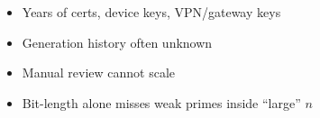 \documentclass[12pt,landscape]{article}
\newenvironment{slidepage}{%
  \noindent\begin{minipage}[t][\dimexpr\textheight-0.35cm\relax][s]{\textwidth}%
}{\end{minipage}\newpage}
\begin{document}
\begin{slidepage}
\begin{minipage}[t]{0.32\textwidth}
{\begin{minipage}[t]{0.94\textwidth}
\begin{itemize}\normalsize
  \item Years of certs, device keys, VPN/gateway keys
  \item Generation history often unknown
  \item Manual review cannot scale
  \item Bit-length alone misses weak primes inside ``large'' $n$
\end{itemize}
\vspace{3pt}\end{minipage}}
\end{minipage}\hfill
\begin{minipage}[t]{0.32\textwidth}
\end{minipage}
\vspace{\fill}
\end{slidepage}
\end{document}
